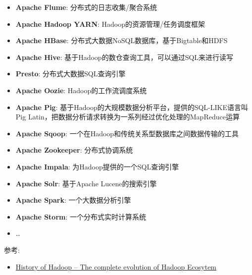 \documentclass[12pt]{article}
\begin{document}
\begin{itemize}
\tightlist
\item
  \textbf{Apache Flume}: 分布式的日志收集/聚合系统
\item
  \textbf{Apache Hadoop YARN}: Hadoop的资源管理/任务调度框架
\item
  \textbf{Apache HBase}: 分布式大数据NoSQL数据库，基于Bigtable和HDFS
\item
  \textbf{Apache Hive}: 基于Hadoop的数仓查询工具，可以通过SQL来进行读写
\item
  \textbf{Presto}: 分布式大数据SQL查询引擎
\item
  \textbf{Apache Oozie}: Hadoop的工作流调度系统
\item
  \textbf{Apache Pig}: 基于Hadoop的大规模数据分析平台，提供的SQL-LIKE语言叫Pig Latin，把数据分析请求转换为一系列经过优化处理的MapReduce运算
\item
  \textbf{Apache Sqoop}: 一个在Hadoop和传统关系型数据库之间数据传输的工具
\item
  \textbf{Apache Zookeeper}: 分布式协调系统
\item
  \textbf{Apache Impala}: 为Hadoop提供的一个SQL查询引擎
\item
  \textbf{Apache Solr}: 基于Apache Lucene的搜索引擎
\item
  \textbf{Apache Spark}: 一个大数据分析引擎
\item
  \textbf{Apache Storm}: 一个分布式实时计算系统
\item
  \ldots{}
\end{itemize}

参考:

\begin{itemize}
\tightlist
\item
  \href{https://data-flair.training/blogs/hadoop-history/}{History of Hadoop -- The complete evolution of Hadoop Ecosytem}
\end{itemize}
\end{document}
